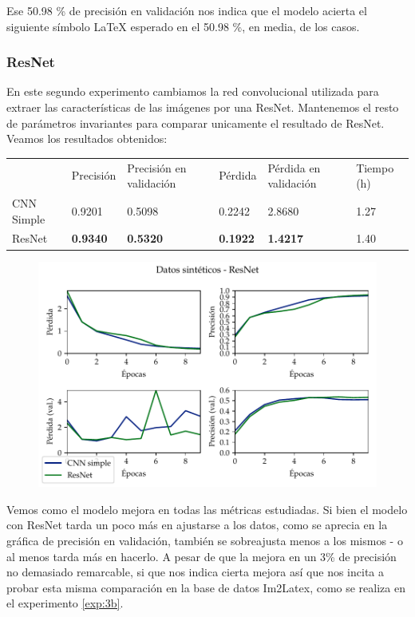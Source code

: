 \documentclass[a4paper, 20pt, dvipsnames]{article}
\begin{document}
Ese 50.98 \% de precisión en validación nos indica que el modelo acierta el
siguiente símbolo \LaTeX{} esperado en el 50.98 \%, en media, de los casos.


\subsubsection{ResNet}
\label{exp:toy2}

En este segundo experimento cambiamos la red convolucional utilizada para
extraer las características de las imágenes por una ResNet. Mantenemos el resto
de parámetros invariantes para comparar unicamente el resultado de
ResNet. Veamos los resultados obtenidos:

\begin{table}[H]
	\centering
	\begin{tabular}{llllll}
		& Precisión       & Precisión en validación & Pérdida         & Pérdida en validación & Tiempo (h) \\ \cline{2-6} 
		CNN Simple & 0.9201          & 0.5098                  & 0.2242          & 2.8680                & 1.27       \\
		ResNet     & \textbf{0.9340} & \textbf{0.5320}         & \textbf{0.1922} & \textbf{1.4217}       & 1.40      
	\end{tabular}
\end{table}

\begin{figure}[H]
	\centering
	\includegraphics{fig/toy-2.pdf}
\end{figure}

Vemos como el modelo mejora en todas las métricas estudiadas. Si bien el modelo
con ResNet tarda un poco más en ajustarse a los datos, como se aprecia en la
gráfica de precisión en validación, también se sobreajusta menos a los mismos -
o al menos tarda más en hacerlo. A pesar de que la mejora en un 3\% de precisión
no demasiado remarcable, si que nos indica cierta mejora así que nos incita a
probar esta misma comparación en la base de datos Im2Latex, como se realiza en
el experimento \ref{exp:3b}.
\end{document}
